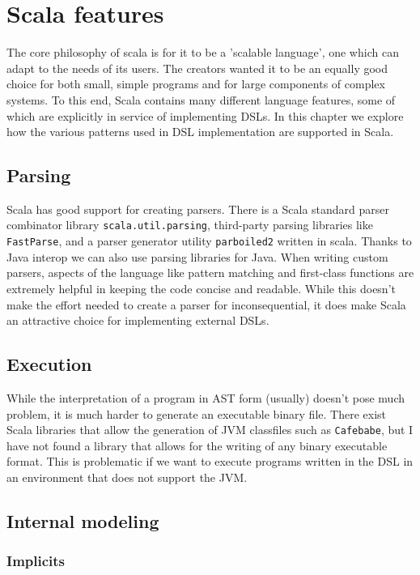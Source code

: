 \chapter{Scala features}
The core philosophy of scala is for it to be a 'scalable language', one which can adapt to the needs of its users. The creators wanted it to be an equally good choice for both small, simple programs and for large components of complex systems. To this end, Scala contains many different language features, some of which are explicitly in service of implementing DSLs. In this chapter we explore how the various patterns used in DSL implementation are supported in Scala.

\section{Parsing}

Scala has good support for creating parsers. There is a Scala standard parser combinator library \texttt{scala.util.parsing}, third-party parsing libraries like \texttt{FastParse}, and a parser generator utility \texttt{parboiled2} written in scala. Thanks to Java interop we can also use parsing libraries for Java. When writing custom parsers, aspects of the language like pattern matching and first-class functions are extremely helpful in keeping the code concise and readable. While this doesn't make the effort needed to create a parser for inconsequential, it does make Scala an attractive choice for implementing external DSLs.

\section{Execution}

While the interpretation of a program in AST form  (usually) doesn't pose much problem, it is much harder to generate an executable binary file. There exist Scala libraries that allow the generation of JVM classfiles such as \texttt{Cafebabe}, but I have not found a library that allows for the writing of any binary executable format. This is problematic if we want to execute programs written in the DSL in an environment that does not support the JVM.

\section{Internal modeling}

\subsection{Implicits}

